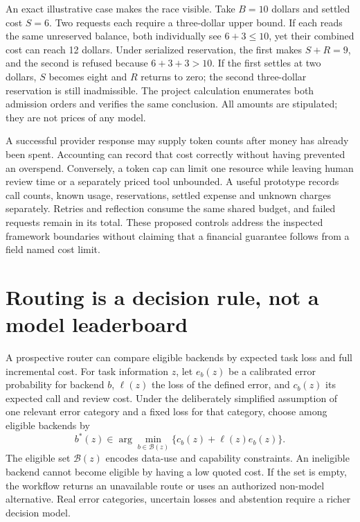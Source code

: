 An exact illustrative case makes the race visible. Take $B=10$ dollars and
settled cost $S=6$. Two requests each require a three-dollar upper bound.
If each reads the same unreserved balance, both individually see
$6+3\le10$, yet their combined cost can reach 12 dollars. Under serialized
reservation, the first makes $S+R=9$, and the second is refused because
$6+3+3>10$. If the first settles at two dollars, $S$ becomes eight and $R$
returns to zero; the second three-dollar reservation is still inadmissible.
The project calculation enumerates both admission orders and verifies the
same conclusion. All amounts are stipulated; they are not prices of any
model. \citep{exec14_l6_exact}

A successful provider response may supply token counts after money has
already been spent. Accounting can record that cost correctly without
having prevented an overspend. Conversely, a token cap can limit one
resource while leaving human review time or a separately priced tool
unbounded. A useful prototype records call counts, known usage, reservations,
settled expense and unknown charges separately. Retries and reflection
consume the same shared budget, and failed requests remain in its total.
These proposed controls address the inspected framework boundaries without
claiming that a financial guarantee follows from a field named cost limit.

\section{Routing is a decision rule, not a model leaderboard}

A prospective router can compare eligible backends by expected task loss
and full incremental cost. For task information $z$, let $e_b(z)$ be a
calibrated error probability for backend $b$, $\ell(z)$ the loss of the
defined error, and $c_b(z)$ its expected call and review cost. Under the
deliberately simplified assumption of one relevant error category and a
fixed loss for that category, choose among eligible backends by
\begin{equation}
 b^*(z)\in\arg\min_{b\in\mathcal B(z)}
       \{c_b(z)+\ell(z)e_b(z)\}.
 \label{exec14:l6-route}
\end{equation}
The eligible set $\mathcal B(z)$ encodes data-use and capability constraints.
An ineligible backend cannot become eligible by having a low quoted cost.
If the set is empty, the workflow returns an unavailable route or uses an
authorized non-model alternative. Real error categories, uncertain losses
and abstention require a richer decision model. \citep{exec14_l6_exact}

